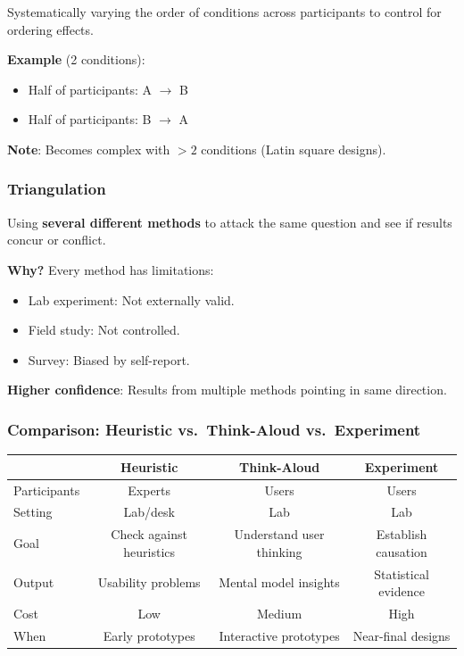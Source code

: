 \begin{defbox}[Counterbalancing]
Systematically varying the order of conditions across participants to control for ordering effects.
\end{defbox}

\textbf{Example} (2 conditions):
\begin{itemize}
  \item Half of participants: A $\to$ B
  \item Half of participants: B $\to$ A
\end{itemize}

\textbf{Note}: Becomes complex with $>2$ conditions (Latin square designs).

\subsubsection*{Triangulation}

\begin{defbox}[Triangulation]
Using \textbf{several different methods} to attack the same question and see if results concur or conflict.
\end{defbox}

\textbf{Why?} Every method has limitations:
\begin{itemize}
  \item Lab experiment: Not externally valid.
  \item Field study: Not controlled.
  \item Survey: Biased by self-report.
\end{itemize}

\textbf{Higher confidence}: Results from multiple methods pointing in same direction.

\subsubsection*{Comparison: Heuristic vs.\ Think-Aloud vs.\ Experiment}

\begin{center}
\renewcommand{\arraystretch}{1.3}
\begin{tabular}{@{} l c c c @{}}
\toprule
& \textbf{Heuristic} & \textbf{Think-Aloud} & \textbf{Experiment} \\
\midrule
Participants & Experts & Users & Users \\
Setting & Lab/desk & Lab & Lab \\
Goal & Check against heuristics & Understand user thinking & Establish causation \\
Output & Usability problems & Mental model insights & Statistical evidence \\
Cost & Low & Medium & High \\
When & Early prototypes & Interactive prototypes & Near-final designs \\
\bottomrule
\end{tabular}
\end{center}

